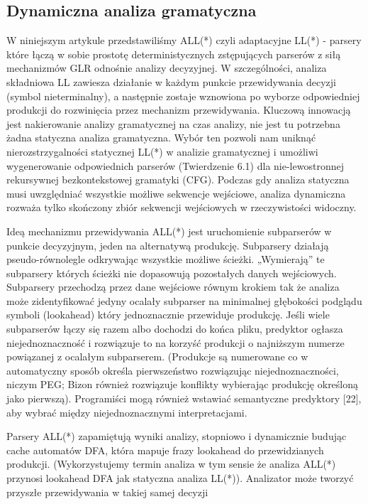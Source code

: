 \subsection{Dynamiczna analiza gramatyczna}
W niniejszym artykule przedstawiliśmy ALL(*) czyli adaptacyjne LL(*) - parsery
które łączą w sobie prostotę deterministycznych zstępujących parserów z
siłą mechanizmów GLR odnośnie analizy decyzyjnej.
W szczególności, analiza składniowa LL zawiesza działanie w każdym punkcie
przewidywania decyzji (symbol nieterminalny), a następnie zostaje wznowiona
po wyborze odpowiedniej produkcji do rozwinięcia przez mechanizm przewidywania.
Kluczową innowacją jest nakierowanie analizy gramatycznej na czas analizy,
nie jest tu potrzebna żadna statyczna analiza gramatyczna.
Wybór ten pozwoli nam uniknąć nierozstrzygalności statycznej LL(*) w analizie
gramatycznej i umożliwi wygenerowanie odpowiednich parserów (Twierdzenie 6.1)
dla nie-lewostronnej rekursywnej bezkontekstowej gramatyki (CFG).
Podczas gdy analiza statyczna musi uwzględniać wszystkie możliwe sekwencje
wejściowe, analiza dynamiczna rozważa tylko skończony zbiór sekwencji
wejściowych w rzeczywistości widoczny.
\par
Ideą mechanizmu przewidywania ALL(*) jest uruchomienie subparserów w punkcie
decyzyjnym, jeden na alternatywą produkcję.
Subparsery działają pseudo-równolegle odkrywając wszystkie możliwe ścieżki.
„Wymierają” te subparsery których ścieżki nie dopasowują pozostałych
danych wejściowych.
Subparsery przechodzą przez dane wejściowe równym krokiem tak że analiza może
zidentyfikować jedyny ocalały subparser na minimalnej głębokości podglądu
symboli (lookahead) który jednoznacznie przewiduje produkcję.
Jeśli wiele subparserów łączy się razem albo dochodzi do końca pliku, predyktor
ogłasza niejednoznaczność i rozwiązuje to na korzyść produkcji o najniższym
numerze powiązanej z ocalałym subparserem.
(Produkcje są numerowane co w automatyczny sposób określa pierwszeństwo
rozwiązując niejednoznaczności, niczym PEG; Bizon również rozwiązuje konflikty
wybierając produkcję określoną jako pierwszą).
Programiści mogą również wstawiać semantyczne predyktory [22], aby wybrać
między niejednoznacznymi interpretacjami.
\par
Parsery ALL(*) zapamiętują wyniki analizy, stopniowo i dynamicznie budując
cache automatów DFA, która mapuje frazy lookahead do przewidzianych produkcji.
(Wykorzystujemy termin analiza w tym sensie że analiza ALL(*) przynosi
lookahead DFA jak statyczna analiza LL(*)).
Analizator może tworzyć przyszłe przewidywania w takiej samej decyzji
